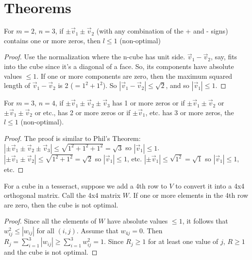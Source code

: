 \section{Theorems}
\label{appendix:theorems}
\begin{theorem}
For $m=2$, $n=3$, if $\pm\vec{v}_1 \pm\vec{v}_2$ (with any combination of the
+ and - signs) contains one or more zeros, then $l \leq 1$ (non-optimal)
\end{theorem}
\begin{proof}
Use the normalization where the n-cube has unit side.  $\vec{v}_1 -
\vec{v}_2$, say, fits into the cube since it's a diagonal of a face.  So, its
components have absolute values $\leq 1$.  If one or more components are zero,
then the maximum squared length of $\vec{v}_1 - \vec{v}_2$ is 2 ($= 1^2 +
1^2$).  So $|\vec{v}_1 - \vec{v}_2| \leq \sqrt{2}$, and so $|\vec{v}_1| \leq
1$.
\end{proof}
\vspace{0.2in}
\begin{theorem}
For $m=3$, $n=4$, if $\pm\vec{v}_1 \pm\vec{v}_2 \pm\vec{v}_3$ has 1 or more
zeros or if $\pm\vec{v}_1 \pm\vec{v}_2$ or $\pm\vec{v}_1 \pm\vec{v}_2$ or
etc., has 2 or more zeros or if $\pm\vec{v}_1$, etc. has 3 or more zeros, the
$l \leq 1$ (non-optimal).
\end{theorem}
\begin{proof}
The proof is similar to Phil's Theorem: $|\pm\vec{v}_1 \pm\vec{v}_2
\pm\vec{v}_3| \leq \sqrt{1^2+1^2+1^2} = \sqrt{3}$ so $|\vec{v}_1| \leq 1$.
$|\pm\vec{v}_1 \pm\vec{v}_2| \leq \sqrt{1^2+1^2} = \sqrt{2}$ so
$|\vec{v}_1| \leq 1$, etc. $|\pm\vec{v}_1| \leq \sqrt{1^2} = \sqrt{1}$ so
$|\vec{v}_1| \leq 1$, etc.
\end{proof}
\vspace{0.2in}
\begin{theorem}
For a cube in a tesseract, suppose we add a 4th row to $V$ to convert it into
a 4x4 orthogonal matrix.  Call the 4x4 matrix $W$.  If one
or more elements in the 4th row are zero, then the cube is not optimal.
\end{theorem}
\begin{proof}
Since all the elements of $W$ have absolute values $\leq 1$, it follows that
$w_{ij}^2 \leq |w_{ij}|$ for all $(i,j)$.  Assume that $w_{4j} = 0$.  Then
$R_j = \sum_{i=1}^{3} |w_{ij}| \geq \sum_{i=1}^{3} w_{ij}^2 = 1$.  Since $R_j
\geq 1$ for at least one value of $j$, $R \geq 1$ and the cube is not optimal.
\end{proof}
\newpage

